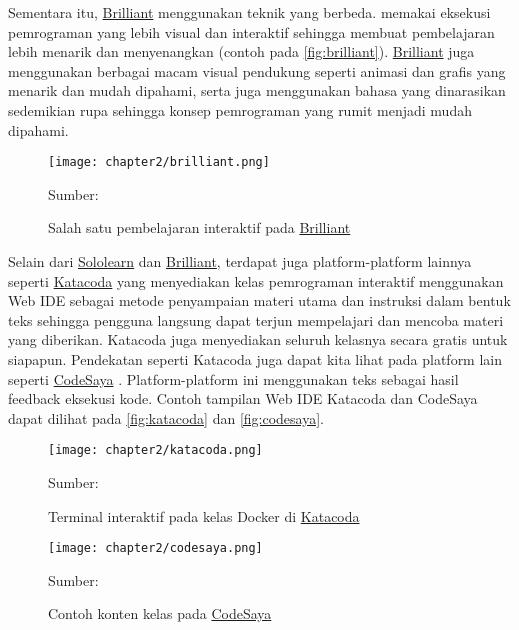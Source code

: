 Sementara itu, \href{https://brilliant.org}{Brilliant} menggunakan teknik yang berbeda. \textcite{brilliant2021media} memakai eksekusi pemrograman yang lebih visual dan interaktif sehingga membuat pembelajaran lebih menarik dan menyenangkan (contoh pada \autoref{fig:brilliant}). \href{https://brilliant.org}{Brilliant} juga menggunakan berbagai macam visual pendukung seperti animasi dan grafis yang menarik dan mudah dipahami, serta juga menggunakan bahasa yang dinarasikan sedemikian rupa sehingga konsep pemrograman yang rumit menjadi mudah dipahami.

\begin{figure}[!h]
  \centering
  \texttt{[image: chapter2/brilliant.png]}
  \caption{\label{fig:brilliant}Salah satu pembelajaran interaktif pada \href{https://brilliant.org}{Brilliant}}
  Sumber: \textcite{brilliant2021media}
\end{figure}

Selain dari \href{https://www.sololearn.com}{Sololearn} dan \href{https://brilliant.org}{Brilliant}, terdapat juga platform-platform lainnya seperti \href{https://www.katacoda.com/}{Katacoda} \parencite{katacoda2021media} yang menyediakan kelas pemrograman interaktif menggunakan Web IDE sebagai metode penyampaian materi utama dan instruksi dalam bentuk teks sehingga pengguna langsung dapat terjun mempelajari dan mencoba materi yang diberikan. Katacoda juga menyediakan seluruh kelasnya secara gratis untuk siapapun. Pendekatan seperti Katacoda juga dapat kita lihat pada platform lain seperti \href{https://www.codesaya.com/}{CodeSaya} \parencite{codesaya2021media}. Platform-platform ini menggunakan teks sebagai hasil feedback eksekusi kode. Contoh tampilan Web IDE Katacoda dan CodeSaya dapat dilihat pada \autoref{fig:katacoda} dan \autoref{fig:codesaya}.

\begin{figure}[!h]
  \centering
  \texttt{[image: chapter2/katacoda.png]}
  \caption{\label{fig:katacoda}Terminal interaktif pada kelas Docker di \href{https://www.katacoda.com/}{Katacoda}}
  Sumber: \textcite{katacoda2021media}
\end{figure}

\begin{figure}[!h]
  \centering
  \texttt{[image: chapter2/codesaya.png]}
  \caption{\label{fig:codesaya}Contoh konten kelas pada \href{https://www.codesaya.com/}{CodeSaya}}
  Sumber: \textcite{codesaya2021media}
\end{figure}

